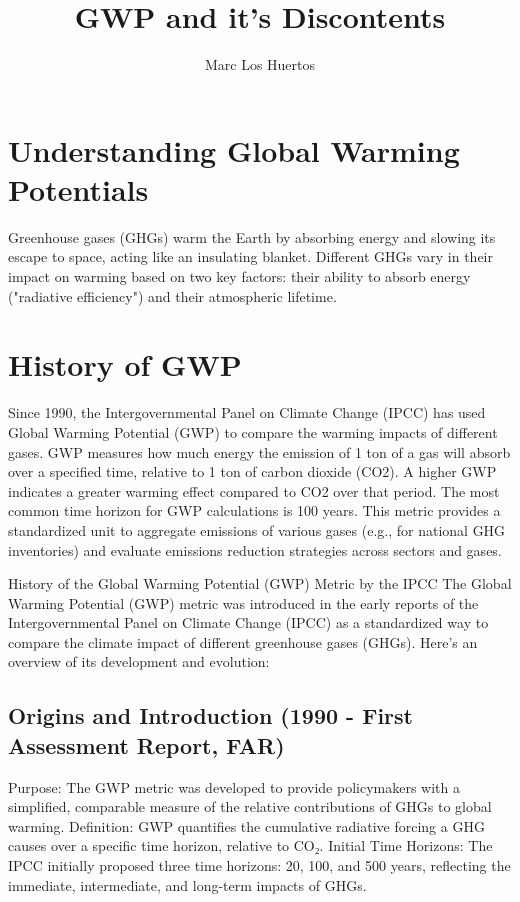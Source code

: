 \documentclass{tufte-handout}\usepackage[]{graphicx}\usepackage[]{xcolor}
\title{GWP and it's Discontents}
\author{Marc Los Huertos}
\begin{document}
\maketitle

\section{Understanding Global Warming Potentials}

Greenhouse gases (GHGs) warm the Earth by absorbing energy and slowing its escape to space, acting like an insulating blanket. Different GHGs vary in their impact on warming based on two key factors: their ability to absorb energy ("radiative efficiency") and their atmospheric lifetime.

\section{History of GWP}

Since 1990, the Intergovernmental Panel on Climate Change (IPCC) has used Global Warming Potential (GWP) to compare the warming impacts of different gases. GWP measures how much energy the emission of 1 ton of a gas will absorb over a specified time, relative to 1 ton of carbon dioxide (CO2). A higher GWP indicates a greater warming effect compared to CO2 over that period. The most common time horizon for GWP calculations is 100 years. This metric provides a standardized unit to aggregate emissions of various gases (e.g., for national GHG inventories) and evaluate emissions reduction strategies across sectors and gases.

History of the Global Warming Potential (GWP) Metric by the IPCC
The Global Warming Potential (GWP) metric was introduced in the early reports of the Intergovernmental Panel on Climate Change (IPCC) as a standardized way to compare the climate impact of different greenhouse gases (GHGs). Here's an overview of its development and evolution:

\subsection{Origins and Introduction (1990 - First Assessment Report, FAR)}

Purpose: The GWP metric was developed to provide policymakers with a simplified, comparable measure of the relative contributions of GHGs to global warming.
Definition: GWP quantifies the cumulative radiative forcing a GHG causes over a specific time horizon, relative to CO₂.
Initial Time Horizons: The IPCC initially proposed three time horizons: 20, 100, and 500 years, reflecting the immediate, intermediate, and long-term impacts of GHGs.
\end{document}
